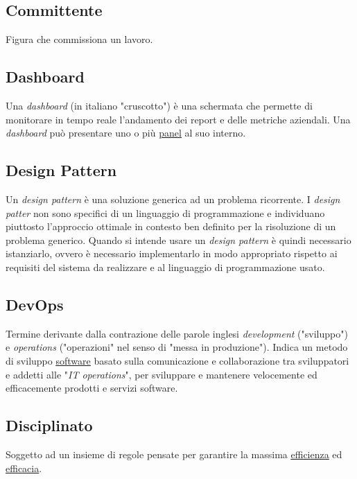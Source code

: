 	\subsection{Committente}
	\label{sec:committente}
	Figura che commissiona un lavoro.

	\newpage

	
	\subsection{Dashboard}
	\label{sec:dashboard}
	Una \emph{dashboard} (in italiano "cruscotto") è una schermata che permette di monitorare in tempo reale l’andamento dei report e delle metriche aziendali. Una \emph{dashboard} può presentare uno o più \underline{\hyperref[sec:panel]{panel}} al suo interno.

	
	\subsection{Design Pattern}
	\label{sec:designpatter}
	Un \emph{design pattern} è una soluzione generica ad un problema ricorrente. I \emph{design patter} non sono specifici di un linguaggio di programmazione e individuano piuttosto l'approccio ottimale in contesto ben definito per la risoluzione di un problema generico. Quando si intende usare un \emph{design pattern} è quindi necessario istanziarlo, ovvero è necessario implementarlo in modo appropriato rispetto ai requisiti del sistema da realizzare e al linguaggio di programmazione usato.

		
	\subsection{DevOps}
	\label{sec:devops}
	Termine derivante dalla contrazione delle parole inglesi \emph{development} ("sviluppo") e \emph{operations} ("operazioni" nel senso di "messa in produzione"). Indica un metodo di sviluppo \underline{\hyperref[sec:prodottosoftware]{software}} basato sulla comunicazione e collaborazione tra sviluppatori e addetti alle "\emph{IT operations}", per sviluppare e mantenere velocemente ed efficacemente prodotti e servizi software.


	\subsection{Disciplinato}
	\label{sec:disciplinato}
	Soggetto ad un insieme di regole pensate per garantire la massima \underline{\hyperref[sec:efficienza]{efficienza}} ed \underline{\hyperref[sec:efficacia]{efficacia}}.


